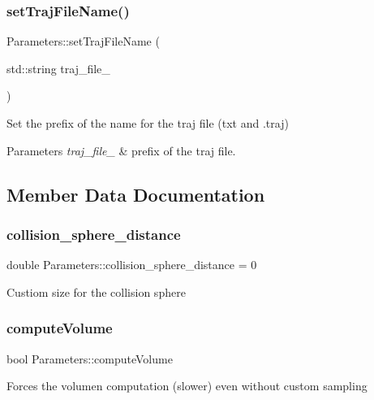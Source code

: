 \subsubsection{\texorpdfstring{set\+Traj\+File\+Name()}{setTrajFileName()}}
{\footnotesize\ttfamily Parameters\+::set\+Traj\+File\+Name (\begin{DoxyParamCaption}\item[{std\+::string}]{traj\+\_\+file\+\_\+ }\end{DoxyParamCaption})}



Set the prefix of the name for the traj file (txt and .traj) 


\begin{DoxyParams}{Parameters}
{\em traj\+\_\+file\+\_\+} & prefix of the traj file. \\
\hline
\end{DoxyParams}


\subsection{Member Data Documentation}
\mbox{\label{class_parameters_abe008f02a49ef7f7a6f041f79cc81fbb}} 
\subsubsection{\texorpdfstring{collision\+\_\+sphere\+\_\+distance}{collision\_sphere\_distance}}
{\footnotesize\ttfamily double Parameters\+::collision\+\_\+sphere\+\_\+distance = 0}

Custiom size for the collision sphere \mbox{\label{class_parameters_a669c92fe7864a00da04bba0c2af93a16}} 
\subsubsection{\texorpdfstring{compute\+Volume}{computeVolume}}
{\footnotesize\ttfamily bool Parameters\+::compute\+Volume}

Forces the volumen computation (slower) even without custom sampling \mbox{\label{class_parameters_af023e7efce57b9da0837731db6a85c87}} 
